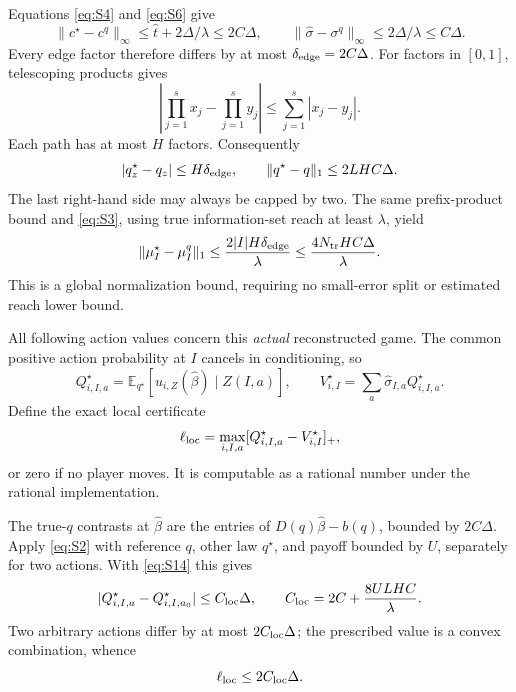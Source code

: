 \documentclass[11pt,a4paper]{article}
\numberwithin{equation}{section}
\theoremstyle{definition}
\newcommand{\E}{\mathbb E}
\begin{document}
Equations \eqref{eq:S4} and \eqref{eq:S6} give
\[
 \|c^\star-c^q\|_\infty\le\widehat t+2\Delta/\lambda
                         \le2C\Delta,\qquad
 \|\widehat\sigma-\sigma^q\|_\infty\le2\Delta/\lambda\le C\Delta.
\]
Every edge factor therefore differs by at most
\(\delta_{\rm edge}=2C\Delta\).
For factors in \([0,1]\), telescoping products gives
\[
 \left|\prod_{j=1}^s x_j-\prod_{j=1}^s y_j\right|
                    \le\sum_{j=1}^s|x_j-y_j|.
\]
Each path has at most \(H\) factors. Consequently
\begin{equation}\label{eq:S14}
 |q^\star_z-q_z|\le H\delta_{\rm edge},\qquad
 \|q^\star-q\|_1\le2LHC\Delta .
\end{equation}
The last right-hand side may always be capped by two.
The same prefix-product bound and \eqref{eq:S3}, using true
information-set reach at least \(\lambda\), yield
\begin{equation}\label{eq:S15}
 \|\mu^\star_I-\mu^q_I\|_1
 \le\frac{2|I|H\delta_{\rm edge}}{\lambda}
 \le\frac{4N_{\rm tr}HC\Delta}{\lambda}.
\end{equation}
This is a global normalization bound, requiring no small-error split
or estimated reach lower bound.

All following action values concern this \emph{actual} reconstructed
game. The common positive action probability at \(I\) cancels in
conditioning, so
\begin{equation}\label{eq:S16}
 Q^\star_{i,I,a}
    =\E_{q^\star}[u_{i,Z}(\widehat\beta)\mid Z(I,a)],\qquad
 V^\star_{i,I}=\sum_a\widehat\sigma_{I,a}Q^\star_{i,I,a}.
\end{equation}
Define the exact local certificate
\[
 \ell_{\rm loc}=\max_{i,I,a}[Q^\star_{i,I,a}-V^\star_{i,I}]_+,
\]
or zero if no player moves. It is computable as a rational number
under the rational implementation.

The true-\(q\) contrasts at \(\widehat\beta\) are the entries of
\(D(q)\widehat\beta-b(q)\), bounded by \(2C\Delta\).
Apply \eqref{eq:S2} with reference \(q\), other law \(q^\star\),
and payoff bounded by \(U\), separately for two actions. With
\eqref{eq:S14} this gives
\begin{equation}\label{eq:S17}
 |Q^\star_{i,I,a}-Q^\star_{i,I,a_0}|
       \le C_{\rm loc}\Delta,\qquad
 C_{\rm loc}=2C+\frac{8ULHC}{\lambda}.
\end{equation}
Two arbitrary actions differ by at most \(2C_{\rm loc}\Delta\);
the prescribed value is a convex combination, whence
\begin{equation}\label{eq:S18}
 \ell_{\rm loc}\le2C_{\rm loc}\Delta .
\end{equation}
\end{document}
